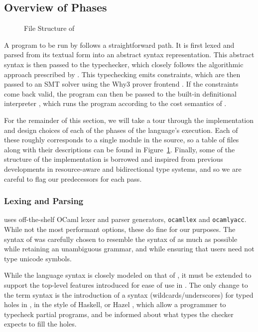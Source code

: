 \subsection{Overview of Phases}
\begin{figure}

\caption{File Structure of \lambdaamorimpl}
\label{fig:lambdaamorimpl-file-structure}
\end{figure}
A program to be run by \lambdaamorimpl follows a straightforward path. It is first lexed and parsed from its textual form into an abstract syntax representation. This abstract syntax is then passed to the typechecker, which closely follows the algorithmic approach prescribed by \bilambdaamor. This typechecking emits constraints, which are then passed to an SMT solver using the Why3 prover frontend \cite{boogie11why3}. If the constraints come back valid, the program can then be passed to the built-in definitional interpreter \cite{reynolds:acm72}, which runs the program according to the cost semantics of \citet{rajani-et-al:popl21}.

For the remainder of this section, we will take a tour through the implementation and design choices of each of the phases of the language's execution. Each of these roughly corresponds to a single module in the \lambdaamorimpl source, so a table of files along with their descriptions can be found in Figure~\ref{fig:lambdaamorimpl-file-structure}. Finally, some of the structure of the implementation is borrowed and inspired from previous developments in resource-aware and bidirectional type systems, and so we are careful to flag our predecessors for each pass.


\subsubsection{Lexing and Parsing}
\lambdaamorimpl uses off-the-shelf OCaml lexer and parser generators, \texttt{ocamllex} and \texttt{ocamlyacc}. While not the most performant options, these do fine for our purposes. The syntax of \lambdaamorimpl was carefully chosen to resemble the syntax of \bilambdaamor as much as possible while retaining an unambiguous grammar, and while ensuring that users need not type unicode symbols.

While the language syntax is closely modeled on that of \bilambdaamor, it must be extended to support the top-level features introduced for ease of use in \lambdaamorimpl. The only change to the term syntax is the introduction of a syntax (wildcards/underscores) for typed holes in \lambdaamorimpl, in the style of Haskell, or Hazel \cite{omar-et-al:popl17}, which allow a programmer to typecheck partial programs, and be informed about what types the checker expects to fill the holes.

